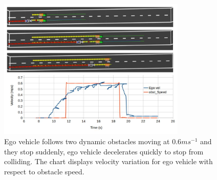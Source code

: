 \begin{figure}
	\centering
	\includegraphics[width=0.8\textwidth]{Images/evaluation/sudden_stopping_lane_blocked_2.jpg}
	\caption{Ego vehicle follows two dynamic obstacles moving at $0.6ms^{-1}$ and they stop suddenly, ego vehicle decelerates quickly to stop from colliding. The chart displays velocity variation for ego vehicle with respect to obstacle speed.}
	\label{dynamic_2}
\end{figure}



 





